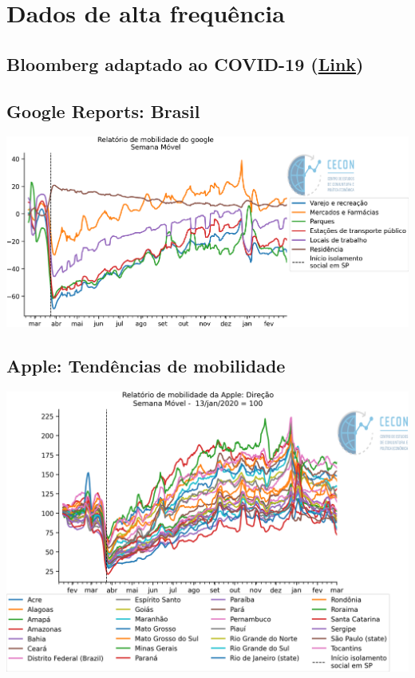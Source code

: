 \documentclass{SelfArx}
\begin{document}
\section*{Dados de alta frequência}
\label{sec:org44097f5}

\subsection*{Bloomberg adaptado ao COVID-19 (\href{https://www.bloomberg.com/news/articles/2020-11-13/alternative-data-show-activity-crashes-as-virus-resurges-chart}{Link})}
\label{sec:orgde2c690}

\subsection*{Google Reports: Brasil}
\label{sec:org2879772}

\begin{center}
\includegraphics[width=.9\linewidth]{./figs/Granulares/GoogleReport_Brasil.png}
\end{center}

\subsection*{Apple: Tendências de mobilidade}
\label{sec:org4a82bc2}

\begin{center}
\includegraphics[width=.9\linewidth]{./figs/Granulares/AppleReport_Brasil.png}
\end{center}
\end{document}
